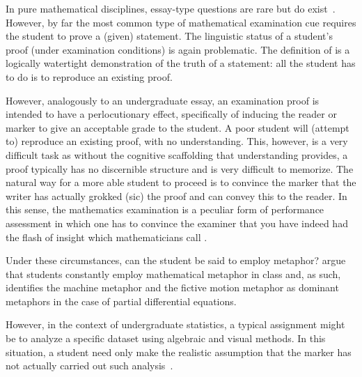 In pure mathematical disciplines, essay-type questions are rare but do
exist~\citep{johnson1983}.  However, by far the most common type of
mathematical examination cue requires the student to prove a (given)
statement.  The linguistic status of a student's proof (under
examination conditions) is again problematic.  The definition of
 is a logically watertight demonstration of the truth of
a statement: all the student has to do is to reproduce an existing
proof.

However, analogously to an undergraduate essay, an examination proof
is intended to have a perlocutionary effect, specifically of inducing
the reader or marker to give an acceptable grade to the student.  A
poor student will (attempt to) reproduce an existing proof, with no
understanding.  This, however, is a very difficult task as without the
cognitive scaffolding that understanding provides, a proof typically
has no discernible structure and is very difficult to memorize.  The
natural way for a more able student to proceed is to convince the
marker that the writer has actually grokked (sic) the proof and can
convey this to the reader.  In this sense, the mathematics examination
is a peculiar form of performance assessment in which one has to
convince the examiner that you have indeed had the flash of insight
which mathematicians call .

Under these circumstances, can the student be said to employ metaphor?
 argue that students constantly employ mathematical
metaphor in class and, as such, identifies the machine metaphor and
the fictive motion metaphor as dominant metaphors in the case of
partial differential equations.

However, in the context of undergraduate statistics, a typical
assignment might be to analyze a specific dataset using algebraic and
visual methods.  In this situation, a student need only make the
realistic assumption that the marker has not actually carried out such
analysis~\citep{horowitz1986}.



